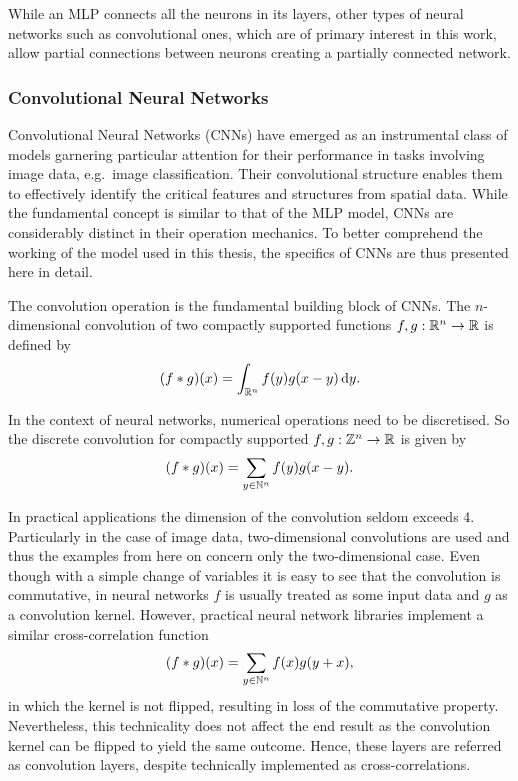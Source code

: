 While an MLP connects all the neurons in its layers, other types of neural networks such as convolutional ones, which are of primary interest in this work, allow partial connections between neurons creating a partially connected network.

\subsubsection{Convolutional Neural Networks}
Convolutional Neural Networks (CNNs) have emerged as an instrumental class of models garnering particular attention for their performance in tasks involving image data, e.g.\ image classification.
Their convolutional structure enables them to effectively identify the critical features and structures from spatial data.
While the fundamental concept is similar to that of the MLP model, CNNs are considerably distinct in their operation mechanics.
To better comprehend the working of the model used in this thesis, the specifics of CNNs are thus presented here in detail.

The convolution operation is the fundamental building block of CNNs.
The $n$-dimensional convolution of two compactly supported functions $f, g : \mathbb{R}^n \rightarrow \mathbb{R}$ is defined by
\begin{equation}
    (f * g)(x) = \int_{\mathbb{R}^n} f(y) g(x-y) \, \mathrm{d}y.
\end{equation}

In the context of neural networks, numerical operations need to be discretised.
So the discrete convolution for compactly supported $f, g : \mathbb{Z}^n \rightarrow \mathbb{R}$ is given by 
\begin{equation}
    (f * g)(x) = \sum_{y \in \mathbb{N}^{n}} f(y) g(x-y).
\end{equation}

In practical applications the dimension of the convolution seldom exceeds 4.
Particularly in the case of image data, two-dimensional convolutions are used and thus the examples from here on concern only the two-dimensional case.
Even though with a simple change of variables it is easy to see that the convolution is commutative, in neural networks $f$ is usually treated as some input data and $g$ as a convolution kernel.
However, practical neural network libraries implement a similar cross-correlation function~\cite{goodfellow}
\begin{equation}
    (f * g)(x) = \sum_{y \in \mathbb{N}^{n}} f(x) g(y+x),
\end{equation}
in which the kernel is not flipped, resulting in loss of the commutative property.
Nevertheless, this technicality does not affect the end result as the convolution kernel can be flipped to yield the same outcome.
Hence, these layers are referred as convolution layers, despite technically implemented as cross-correlations.

